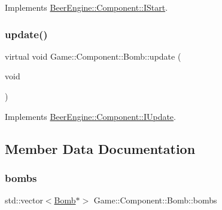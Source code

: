 Implements \mbox{\hyperlink{class_beer_engine_1_1_component_1_1_i_start_aa3e25e86e20c46cdaefc6f6d7f21e495}{Beer\+Engine\+::\+Component\+::\+I\+Start}}.

\mbox{\label{class_game_1_1_component_1_1_bomb_a6685384996c92b8d3f0955c2f6a335b5}} 
\subsubsection{\texorpdfstring{update()}{update()}}
{\footnotesize\ttfamily virtual void Game\+::\+Component\+::\+Bomb\+::update (\begin{DoxyParamCaption}\item[{void}]{ }\end{DoxyParamCaption})\hspace{0.3cm}{\ttfamily [virtual]}}



Implements \mbox{\hyperlink{class_beer_engine_1_1_component_1_1_i_update_aeeda0aa303175720e449b4c51d9867dd}{Beer\+Engine\+::\+Component\+::\+I\+Update}}.



\subsection{Member Data Documentation}
\mbox{\label{class_game_1_1_component_1_1_bomb_a9dc5871647b57df886487e2d936b4dcc}} 
\subsubsection{\texorpdfstring{bombs}{bombs}}
{\footnotesize\ttfamily std\+::vector$<$\mbox{\hyperlink{class_game_1_1_component_1_1_bomb}{Bomb}}$\ast$$>$ Game\+::\+Component\+::\+Bomb\+::bombs\hspace{0.3cm}{\ttfamily [static]}}

\mbox{\label{class_game_1_1_component_1_1_bomb_af6be11b39be1333d5bbd64b059bc2b33}} 
